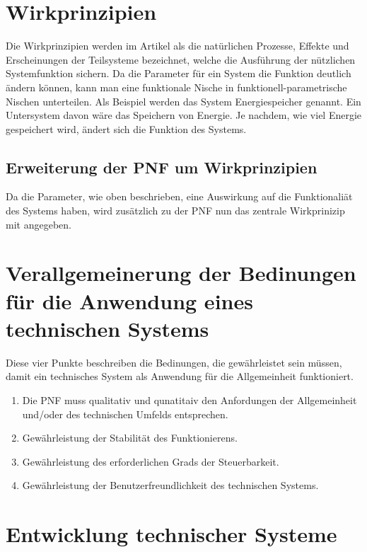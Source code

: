 \documentclass[11pt,a4paper]{article}
\begin{document}
\section{Wirkprinzipien}

Die Wirkprinzipien werden im Artikel als die natürlichen Prozesse, Effekte und
Erscheinungen der Teilsysteme bezeichnet, welche die Ausführung der nützlichen
Systemfunktion sichern.  Da die Parameter für ein System die Funktion deutlich
ändern können, kann man eine funktionale Nische in funktionell-parametrische
Nischen unterteilen.  Als Beispiel werden das System Energiespeicher genannt.
Ein Untersystem davon wäre das Speichern von Energie.  Je nachdem, wie viel
Energie gespeichert wird, ändert sich die Funktion des Systems.

\subsection{Erweiterung der PNF um Wirkprinzipien}

Da die Parameter, wie oben beschrieben, eine Auswirkung auf die Funktionaliät
des Systems haben, wird zusätzlich zu der PNF nun das zentrale Wirkprinizip
mit angegeben.

\section{Verallgemeinerung der Bedinungen für die Anwendung eines technischen
  Systems}

Diese vier Punkte beschreiben die Bedinungen, die gewährleistet sein müssen,
damit ein technisches System als Anwendung für die Allgemeinheit funktioniert.

\begin{enumerate}[noitemsep]
\item Die PNF muss qualitativ und qunatitaiv den Anfordungen der Allgemeinheit
  und/oder des technischen Umfelds entsprechen.
\item Gewährleistung der Stabilität des Funktionierens.
\item Gewährleistung des erforderlichen Grads der Steuerbarkeit.
\item Gewährleistung der Benutzerfreundlichkeit des technischen Systems.
\end{enumerate}

\section{Entwicklung technischer Systeme}
\end{document}
